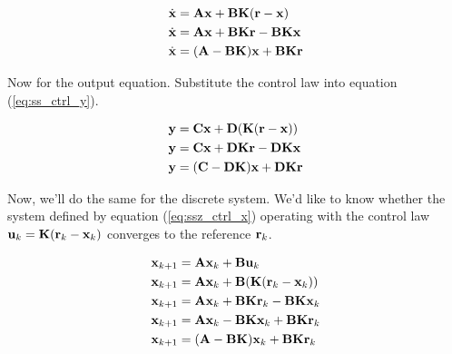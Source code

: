 \begin{align}
  \dot{\mathbf{x}} &= \mathbf{A}\mathbf{x} + \mathbf{B}\mathbf{K}(\mathbf{r} - \mathbf{x}) \nonumber
    \\
  \dot{\mathbf{x}} &= \mathbf{A}\mathbf{x} + \mathbf{B}\mathbf{K}\mathbf{r} -
    \mathbf{B}\mathbf{K}\mathbf{x} \nonumber \\
  \dot{\mathbf{x}} &= (\mathbf{A} - \mathbf{B}\mathbf{K})\mathbf{x} + \mathbf{B}\mathbf{K}\mathbf{r}
\end{align}

Now for the output equation. Substitute the control law into equation
(\ref{eq:ss_ctrl_y}).

\begin{align}
  \mathbf{y} &= \mathbf{C}\mathbf{x} + \mathbf{D}(\mathbf{K}(\mathbf{r} - \mathbf{x})) \nonumber \\
  \mathbf{y} &= \mathbf{C}\mathbf{x} + \mathbf{D}\mathbf{K}\mathbf{r} - \mathbf{D}\mathbf{K}\mathbf{x}
    \nonumber \\
  \mathbf{y} &= (\mathbf{C} - \mathbf{D}\mathbf{K})\mathbf{x} + \mathbf{D}\mathbf{K}\mathbf{r}
\end{align}

Now, we'll do the same for the discrete system. We'd like to know whether the
\gls{system} defined by equation (\ref{eq:ssz_ctrl_x}) operating with the
\gls{control law} $\mathbf{u}_k = \mathbf{K}(\mathbf{r}_k - \mathbf{x}_k)$ converges to the
\gls{reference} $\mathbf{r}_k$.

\begin{align*}
  \mathbf{x}_{k+1} &= \mathbf{A}\mathbf{x}_k + \mathbf{B}\mathbf{u}_k \\
  \mathbf{x}_{k+1} &= \mathbf{A}\mathbf{x}_k + \mathbf{B}(\mathbf{K}(\mathbf{r}_k - \mathbf{x}_k)) \\
  \mathbf{x}_{k+1} &= \mathbf{A}\mathbf{x}_k + \mathbf{B}\mathbf{K}\mathbf{r}_k -
    \mathbf{B}\mathbf{K}\mathbf{x}_k \\
  \mathbf{x}_{k+1} &= \mathbf{A}\mathbf{x}_k - \mathbf{B}\mathbf{K}\mathbf{x}_k +
    \mathbf{B}\mathbf{K}\mathbf{r}_k \\
  \mathbf{x}_{k+1} &= (\mathbf{A} - \mathbf{B}\mathbf{K})\mathbf{x}_k + \mathbf{B}\mathbf{K}\mathbf{r}_k
\end{align*}

